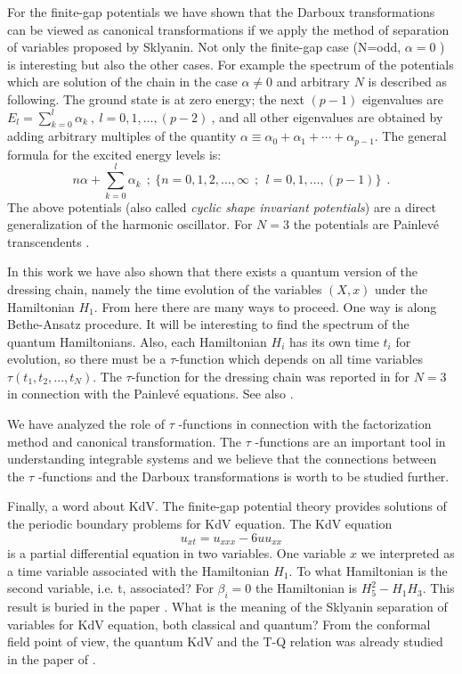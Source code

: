 \documentclass[a4paper,11pt]{article}
\begin{document}
For the finite-gap potentials we have shown that the Darboux transformations
can be viewed as canonical transformations if we apply the method of
separation of variables proposed by Sklyanin. Not only the finite-gap case
(N=odd, $\alpha =0$ ) is interesting but also the other cases. For example
the spectrum of the potentials which are solution of the chain in the case
 $\alpha \ne 0$ and arbitrary $N$ is described as following.
The ground state is at zero energy; the next $(p-1)$ eigenvalues
are $E_l = \sum_{k=0}^{l} \alpha_k~,~l=0,1,\ldots,(p-2)~ $, and all other
eigenvalues are obtained by adding arbitrary multiples
of the quantity $\alpha \equiv \alpha_0+\alpha_1+\cdots+\alpha_{p-1}$. The general formula for the excited energy levels is: \cite{Sukhatme}
\begin{equation}
n \alpha + \sum_{k=0}^l \alpha_k ~~;
~\{n=0,1,2,\ldots,\infty~~;~~l=0,1,\ldots,(p-1)\}~~.
\label{ev}
\end{equation}
The above potentials (also called {\em cyclic shape invariant potentials})
are a direct generalization of the harmonic oscillator.
For $N=3$ the potentials are Painlev\'e transcendents \cite{Veselov}.

In this work we have also shown that there exists a quantum version of the dressing
chain, namely the time evolution of the variables $(X,x)$ under the Hamiltonian
$H_1$. From here there are many ways to proceed. One way is along Bethe-Ansatz
procedure. It will be interesting to find the spectrum of the quantum Hamiltonians.
Also, each Hamiltonian $H_i$ has its own time $t_i$ for evolution, so there must be
a $\tau $-function which depends on all time variables $\tau (t_1,t_2,...,t_N)$. The
$\tau $-function for the dressing chain was reported in \cite{Okamoto} for $N=3$
in connection with the Painlev\'{e} equations. See also \cite{Yamada}.

We have analyzed the role of $\tau$ -functions in connection with the factorization
method and canonical transformation. The $\tau$ -functions are an important tool in
understanding integrable systems and we believe that the connections between the
$\tau$ -functions and the Darboux transformations is worth to be studied further.

Finally, a word about KdV. The finite-gap potential
theory provides solutions of the periodic boundary problems for KdV
equation. The KdV equation
\begin{equation}
u_{xt}=u_{xxx}-6uu_{xx}
\end{equation}
is a partial differential equation in two variables. One variable $x$ we
interpreted as a time variable associated with the Hamiltonian $H_1$. To
what Hamiltonian is the second variable, i.e. t, associated? For $\beta_i=0$
the Hamiltonian is $H_5^2-H_1H_3$. This result is buried in the paper
\cite{Weiss}. What is the meaning of the Sklyanin separation of variables
for KdV equation, both classical and quantum? From the conformal field point
of view, the quantum KdV and the T-Q relation was already studied in the
paper of \cite{Zam}.
\end{document}
